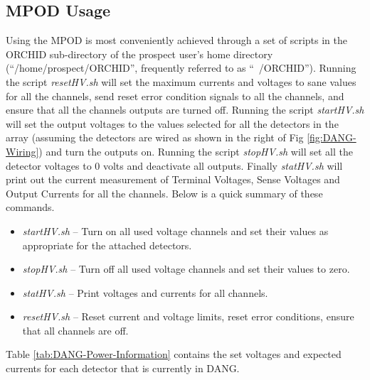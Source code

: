 \documentclass[onecolumn, 10pt, letterpaper, twoside]{article}
\begin{document}
\subsection{MPOD Usage}
Using the MPOD is most conveniently achieved through a set of scripts in the ORCHID sub-directory of the prospect user's home directory (``/home/prospect/ORCHID'', frequently referred to as ``~/ORCHID''). Running the script \emph{resetHV.sh} will set the maximum currents and voltages  to sane values for all the channels, send reset error condition signals to all the channels, and ensure that all the channels outputs are turned off.
Running the script \emph{startHV.sh} will set the output voltages to the values selected for all the detectors in the array (assuming the detectors are wired as shown in the right of Fig \ref{fig:DANG-Wiring}) and turn the outputs on. Running the script \emph{stopHV.sh} will set all the detector voltages to 0 volts and deactivate all outputs. Finally \emph{statHV.sh} will print out the current measurement of Terminal Voltages, Sense Voltages and Output Currents for all the channels. Below is a quick summary of these commands.

\begin{itemize}
\item \emph{startHV.sh} -- Turn on all used voltage channels and set their values as appropriate for the attached detectors.
\item \emph{stopHV.sh} -- Turn off all used voltage channels and set their values to zero.
\item \emph{statHV.sh} -- Print voltages and currents for all channels.
\item \emph{resetHV.sh} -- Reset current and voltage limits, reset error conditions, ensure that all channels are off.
\end{itemize}

Table \ref{tab:DANG-Power-Information} contains the set voltages and expected currents for each detector that is currently in DANG.
\end{document}
